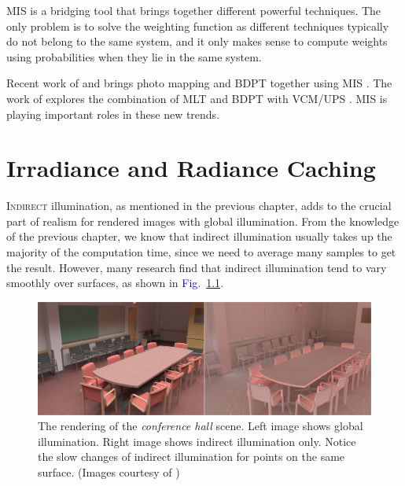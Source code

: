 \documentclass[]{book}
\renewcommand{\figurename}{\textcolor{blue}{Fig.\ }}
\begin{document}
MIS is a bridging tool that brings together different powerful techniques.
The only problem is to solve the weighting function as different techniques typically do not belong to the same system, and it only makes sense to compute weights using probabilities when they lie in the same system.

Recent work of \citeauthor{georgiev2012light} and \citeauthor{hachisuka2012path} brings photo mapping and BDPT together using MIS \cite{georgiev2012light, hachisuka2012path}.
The work of \citeauthor{vsik2016robust} explores the combination of MLT and BDPT with VCM/UPS \cite{vsik2016robust}.
MIS is playing important roles in these new trends.


\chapter{Irradiance and Radiance Caching}
\label{chap:ir-radiance}
\lettrine{I}{ndirect} illumination, as mentioned in the previous chapter, adds to the crucial part of realism for rendered images with global illumination.
From the knowledge of the previous chapter, we know that indirect illumination usually takes up the majority of the computation time, since we need to average many samples to get the result.
However, many research find that indirect illumination tend to vary smoothly over surfaces, as shown in \figurename \ref{fig:IC:coherence}.

\begin{figure}[!ht]
	\centering
	\includegraphics[width=5.0in]{img/IC-coherence.png}
	\caption[Indirect Illumination Coherence]{The rendering of the \textit{conference hall} scene. Left image shows global illumination. Right image shows indirect illumination only. Notice the slow changes of indirect illumination for points on the same surface. (Images courtesy of \citeauthor{ward1988IC})}
	\label{fig:IC:coherence}
\end{figure}
\end{document}
